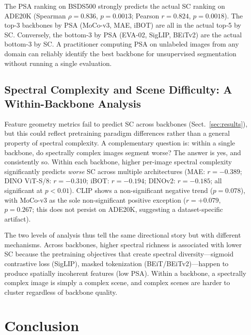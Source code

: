 \documentclass[runningheads]{llncs}
\begin{document}
The PSA ranking on BSDS500 strongly predicts the actual SC ranking on ADE20K (Spearman $\rho=0.836$, $p=0.0013$; Pearson $r=0.824$, $p=0.0018$). The top-3 backbones by PSA (MoCo-v3, MAE, iBOT) are all in the actual top-5 by SC. Conversely, the bottom-3 by PSA (EVA-02, SigLIP, BEiTv2) are the actual bottom-3 by SC. A practitioner computing PSA on unlabeled images from any domain can reliably identify the best backbone for unsupervised segmentation without running a single evaluation.

\subsection{Spectral Complexity and Scene Difficulty: A Within-Backbone Analysis}
\label{sec:simpson}

Feature geometry metrics fail to predict SC across backbones (Sect.~\ref{sec:results}), but this could reflect pretraining paradigm differences rather than a general property of spectral complexity. A complementary question is: within a single backbone, do spectrally complex images segment worse? The answer is yes, and consistently so. Within each backbone, higher per-image spectral complexity significantly predicts \emph{worse} SC across multiple architectures (MAE: $r=-0.389$; DINO ViT-S/8: $r=-0.310$; iBOT: $r=-0.194$; DINOv2: $r=-0.185$; all significant at $p < 0.01$). CLIP shows a non-significant negative trend ($p=0.078$), with MoCo-v3 as the sole non-significant positive exception ($r=+0.079$, $p=0.267$; this does not persist on ADE20K, suggesting a dataset-specific artifact).

The two levels of analysis thus tell the same directional story but with different mechanisms. Across backbones, higher spectral richness is associated with lower SC because the pretraining objectives that create spectral diversity---sigmoid contrastive loss (SigLIP), masked tokenization (BEiT/BEiTv2)---happen to produce spatially incoherent features (low PSA). Within a backbone, a spectrally complex image is simply a complex scene, and complex scenes are harder to cluster regardless of backbone quality.

\section{Conclusion}
\end{document}
